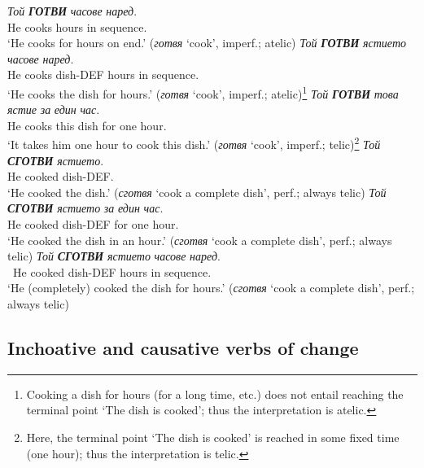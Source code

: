 \documentclass[output=paper,colorlinks,citecolor=brown]{langscibook}
\begin{document}
 \begin{exe}
 \ex \label{ex6}
 \begin{xlist}
 \ex \label{ex6a}
\gll \textit{Той} \textit{\textbf{ГОТВИ}} \textit{часове} \textit{наред}.\\
He cooks hours {in sequence}.  \\
\glt `He cooks for hours on end.' (\textit{готвя} `cook', imperf.; atelic) 
 \ex \label{ex6b}
\gll \textit{Той} \textit{\textbf{ГОТВИ}} \textit{ястието} \textit{часове} \textit{наред}.\\
He cooks dish-DEF hours {in sequence}.  \\
\glt `He cooks the dish for hours.' (\textit{готвя} `cook', imperf.; atelic)\footnote{Cooking a dish for hours (for a long time, etc.) does not entail reaching the terminal point `The dish is cooked'; thus the interpretation is atelic.}
 \ex \label{ex6b1}
\gll \textit{Той} \textit{\textbf{ГОТВИ}} \textit{това} \textit{ястие} \textit{за} \textit{един} \textit{час}.\\
He cooks this dish for one hour.  \\
\glt `It takes him one hour to cook this dish.' (\textit{готвя} `cook', imperf.; telic)\footnote{Here, the terminal point `The dish is cooked' is reached in some fixed time (one hour); thus the interpretation is telic.}
  \ex \label{ex6c}
\gll \textit{Той} \textit{\textbf{СГОТВИ}} \textit{ястието}.\\
He cooked dish-DEF.\\
\glt `He cooked the dish.' (\textit{сготвя} `cook a complete dish', perf.; always telic)
  \ex \label{ex6d}
\gll \textit{Той} \textit{\textbf{СГОТВИ}} \textit{ястието} \textit{за} \textit{един} \textit{час}.\\
He cooked dish-DEF for one hour.\\
\glt `He cooked the dish in an hour.' (\textit{сготвя} `cook a complete dish', perf.; always telic)
  \ex \label{ex6e}
\gll *\textit{Той} \textit{\textbf{СГОТВИ}} \textit{ястието} \textit{часове} \textit{наред}.\\
\ He cooked dish-DEF hours {in sequence}.\\
\glt *`He (completely) cooked the dish for hours.' (\textit{сготвя} `cook a complete dish', perf.; always telic)
\end{xlist}
\end{exe}



\subsection{Inchoative and causative verbs of change}\label{sec:causative}
\end{document}
